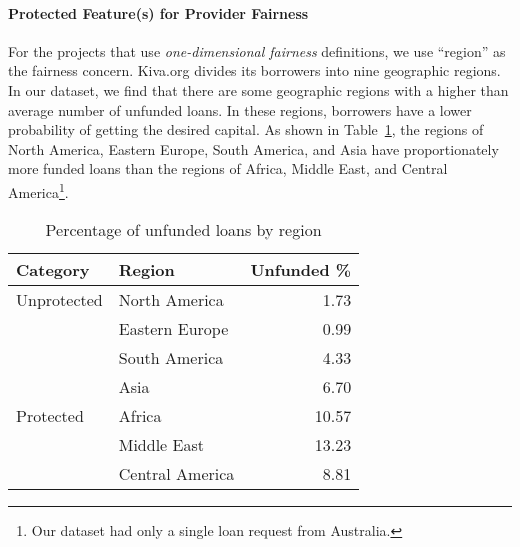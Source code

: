 
        \vspace{0.25cm}
        \noindent \paragraph{Protected Feature(s) for Provider Fairness}
        \vspace{0.25cm}
        
            For the projects that use \textit{one-dimensional fairness} definitions, we use ``region'' as the fairness concern. Kiva.org divides its borrowers into nine geographic regions. In our dataset, we find that there are some geographic regions with a higher than average number of unfunded loans. In these regions, borrowers have a lower probability of getting the desired capital. As shown in Table~\ref{tab:unfunded}, the regions of North America, Eastern Europe, South America, and Asia have proportionately more funded loans than the regions of Africa, Middle East, and Central America\footnote{Our dataset had only a single loan request from Australia.}. 
            
        
            \begin{table}
                \centering
            \begin{tabular}{l|l|r}
                Category & Region & Unfunded \% \\ \hline
                Unprotected & North America & 1.73 \\
                & Eastern Europe & 0.99 \\
                & South America & 4.33 \\
                & Asia & 6.70 \\ \hline
                Protected & Africa & 10.57 \\
                & Middle East & 13.23 \\
                & Central America & 8.81 \\
            \end{tabular}
                \caption{Percentage of unfunded loans by region}
                \label{tab:unfunded}
            \end{table}
     
